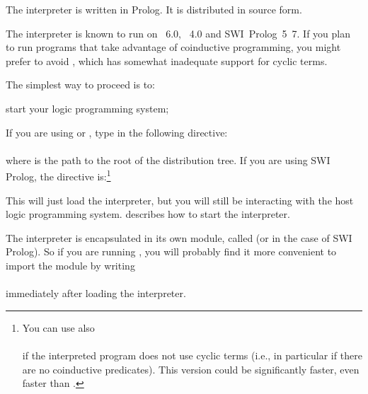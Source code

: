 

%

The interpreter is written in Prolog.  It is distributed in source
form.%

The interpreter is known to run on \Eclipse{}~6.0, \Sicstus{}~4.0 and
SWI~Prolog~5~7.  If you plan to run programs that take advantage of
coinductive programming, you might prefer to avoid \Eclipse{}, which has
somewhat inadequate support for cyclic terms.

The simplest way to proceed is to:
\begin{Enumerate}
\item
  start your logic programming system;
\item
  If you are using \Eclipse{} or \Sicstus{}, type in the following directive:\\
  \ind{}\\
  where  is the path to the root of the distribution
  tree.
  If you are using SWI Prolog, the directive is:\footnote{You can use also\\
    \ind{}\\
      if the interpreted program does not use cyclic terms (i.e., in
      particular if there are no coinductive predicates).  This version could
      be significantly faster, even faster than \Sicstus{}.
  }\\
  \ind{}
\end{Enumerate}

This will just load the interpreter, but you will still be interacting with
the host logic programming system.   describes how
to start the interpreter.

The interpreter is encapsulated in its own module, called  (or
 in the case of SWI Prolog).  So if
you are running \Eclipse{}, you will probably find it more convenient to import
the module by writing\\
\ind{}\label{import-dra}\\
immediately after loading the interpreter.

